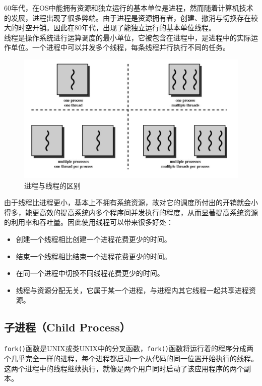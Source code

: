 60年代，在OS中能拥有资源和独立运行的基本单位是进程，然而随着计算机技术的发展，进程出现了很多弊端。由于进程是资源拥有者，创建、撤消与切换存在较大的时空开销。因此在80年代，出现了能独立运行的基本单位线程。 \\

线程是操作系统进行运算调度的最小单位，它被包含在进程中，是进程中的实际运作单位。一个进程中可以并发多个线程，每条线程并行执行不同的任务。

\begin{figure}[H]
	\centering
	\includegraphics[scale=0.6]{img/C2/2-3/1.png}
	\caption{进程与线程的区别}
\end{figure}

由于线程比进程更小，基本上不拥有系统资源，故对它的调度所付出的开销就会小得多，能更高效的提高系统内多个程序间并发执行的程度，从而显著提高系统资源的利用率和吞吐量。因此使用线程可以带来很多好处：

\begin{itemize}
	\item 创建一个线程相比创建一个进程花费更少的时间。
	\item 结束一个线程相比结束一个进程花费更少的时间。
	\item 在同一个进程中切换不同线程花费更少的时间。
	\item 线程与资源分配无关，它属于某一个进程，与进程内其它线程一起共享进程资源。
\end{itemize}

\subsection{子进程（Child Process）}

\lstinline|fork()|函数是UNIX或类UNIX中的分叉函数，\lstinline|fork()|函数将运行着的程序分成两个几乎完全一样的进程，每个进程都启动一个从代码的同一位置开始执行的线程。这两个进程中的线程继续执行，就像是两个用户同时启动了该应用程序的两个副本。


